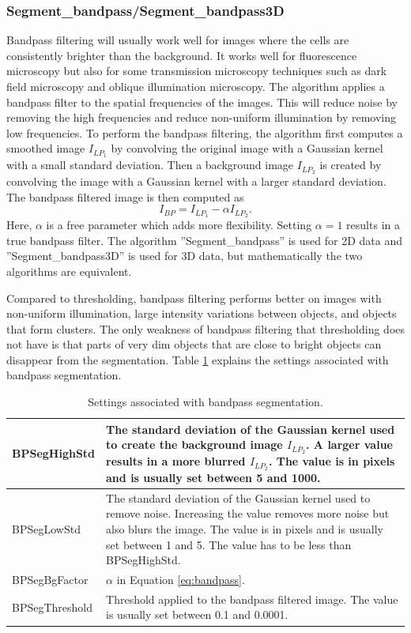 \documentclass[a4paper, oneside, onecolumn, 11pt]{article}
\newcommand{\setting}[1]{''#1''}
\begin{document}
\subsubsection{Segment\_bandpass/Segment\_bandpass3D}
Bandpass filtering will usually work well for images where the cells are consistently brighter than the background. It works well for fluorescence microscopy but also for some transmission microscopy techniques such as dark field microscopy and oblique illumination microscopy. The algorithm applies a bandpass filter to the spatial frequencies of the images. This will reduce noise by removing the high frequencies and reduce non-uniform illumination by removing low frequencies. To perform the bandpass filtering, the algorithm first computes a smoothed image $I_{LP_1}$ by convolving the original image with a Gaussian kernel with a small standard deviation. Then a background image $I_{LP_2}$ is created by convolving the image with a Gaussian kernel with a larger standard deviation. The bandpass filtered image is then computed as
\begin{equation}
I_{BP} = I_{LP_1} - \alpha I_{LP_2}.
\label{eq:bandpass}
\end{equation}
Here, $\alpha$ is a free parameter which adds more flexibility. Setting $\alpha=1$ results in a true bandpass filter. The algorithm \setting{Segment\_bandpass} is used for 2D data and \setting{Segment\_bandpass3D} is used for 3D data, but mathematically the two algorithms are equivalent.

Compared to thresholding, bandpass filtering performs better on images with non-uniform illumination, large intensity variations between objects, and objects that form clusters. The only weakness of bandpass filtering that thresholding does not have is that parts of very dim objects that are close to bright objects can disappear from the segmentation. Table \ref{tab:bandpass-settings} explains the settings associated with bandpass segmentation.

\begin{table}[!htb]
\caption{Settings associated with bandpass segmentation.}
\label{tab:bandpass-settings}
\begin{tabularx}{\textwidth}{lX}
\hline
BPSegHighStd & The standard deviation of the Gaussian kernel used to create the background image $I_{LP_2}$. A larger value results in a more blurred $I_{LP_2}$. The value is in pixels and is usually set between 5 and 1000. \\[5pt] \hline
BPSegLowStd & The standard deviation of the Gaussian kernel used to remove noise. Increasing the value removes more noise but also blurs the image. The value is in pixels and is usually set between 1 and 5. The value has to be less than BPSegHighStd. \\[5pt] \hline
BPSegBgFactor & $\alpha$ in Equation \eqref{eq:bandpass}. \\[5pt] \hline
BPSegThreshold & Threshold applied to the bandpass filtered image. The value is usually set between 0.1 and 0.0001. \\[5pt] \hline
\end{tabularx}
\end{table}
\end{document}
